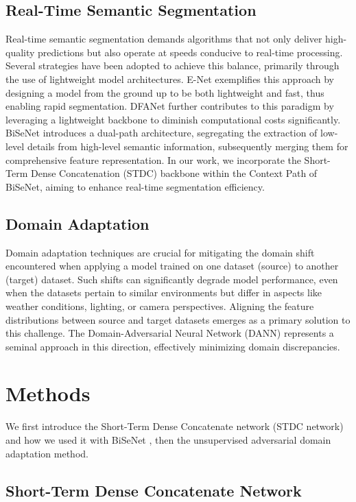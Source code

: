 \documentclass[conference]{IEEEtran}
\begin{document}
\subsection{Real-Time Semantic Segmentation}
Real-time semantic segmentation demands algorithms that not only deliver high-quality predictions but also operate at speeds conducive to real-time processing. Several strategies have been adopted to achieve this balance, primarily through the use of lightweight model architectures. E-Net \cite{b7} exemplifies this approach by designing a model from the ground up to be both lightweight and fast, thus enabling rapid segmentation. DFANet \cite{b8} further contributes to this paradigm by leveraging a lightweight backbone to diminish computational costs significantly. BiSeNet \cite{b2} introduces a dual-path architecture, segregating the extraction of low-level details from high-level semantic information, subsequently merging them for comprehensive feature representation. In our work, we incorporate the Short-Term Dense Concatenation (STDC) backbone within the Context Path of BiSeNet, aiming to enhance real-time segmentation efficiency.

\subsection{Domain Adaptation}
Domain adaptation techniques are crucial for mitigating the domain shift encountered when applying a model trained on one dataset (source) to another (target) dataset. Such shifts can significantly degrade model performance, even when the datasets pertain to similar environments but differ in aspects like weather conditions, lighting, or camera perspectives. Aligning the feature distributions between source and target datasets emerges as a primary solution to this challenge. The Domain-Adversarial Neural Network (DANN) \cite{b9} represents a seminal approach in this direction, effectively minimizing domain discrepancies.

\section{Methods}

We first introduce the Short-Term Dense Concatenate network (STDC network) and how we used it with BiSeNet \cite{b2}, then the unsupervised adversarial domain adaptation method.

\subsection{Short-Term Dense Concatenate Network}
\end{document}
